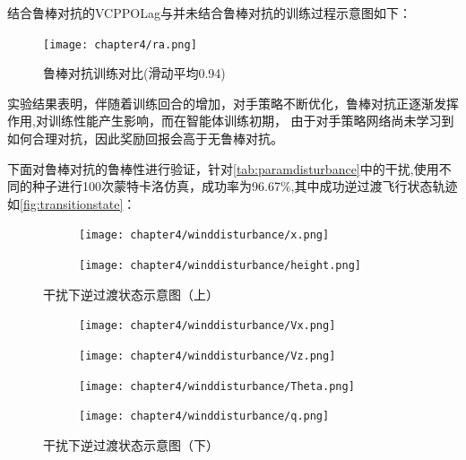 结合鲁棒对抗的VCPPOLag与并未结合鲁棒对抗的训练过程示意图如下：
\begin{figure}[htbp]
    \centering
    \texttt{[image: chapter4/ra.png]}
    \caption{\label{fig:ra}鲁棒对抗训练对比(滑动平均0.94)}
\end{figure}

实验结果表明，伴随着训练回合的增加，对手策略不断优化，鲁棒对抗正逐渐发挥作用,对训练性能产生影响，而在智能体训练初期，
由于对手策略网络尚未学习到如何合理对抗，因此奖励回报会高于无鲁棒对抗。

下面对鲁棒对抗的鲁棒性进行验证，针对\autoref{tab:paramdisturbance}中的干扰,使用不同的种子进行100次蒙特卡洛仿真，成功率为96.67$\%$,其中成功逆过渡飞行状态轨迹如\autoref{fig:transitionstate}：
\begin{figure}[H]
    \centering
    \begin{subfigure}{.55\textwidth}
        \centering
        \texttt{[image: chapter4/winddisturbance/x.png]}
        \label{fig:sub1-1}
    \end{subfigure}%
    \begin{subfigure}{.55\textwidth}
        \centering
        \texttt{[image: chapter4/winddisturbance/height.png]}
        \label{fig:sub2-1}
    \end{subfigure}
    \caption{干扰下逆过渡状态示意图（上）}
    \label{fig:transitionstate-up}
\end{figure}
\begin{figure}[H]
    \centering
    \begin{subfigure}{.55\textwidth}
        \centering
        \texttt{[image: chapter4/winddisturbance/Vx.png]}
        \label{fig:sub3-2}
    \end{subfigure}
    \begin{subfigure}{.55\textwidth}
        \centering
        \texttt{[image: chapter4/winddisturbance/Vz.png]}
        \label{fig:sub4-2}
    \end{subfigure}
    \begin{subfigure}{.55\textwidth}
        \centering
        \texttt{[image: chapter4/winddisturbance/Theta.png]}
        \label{fig:sub5-2}
    \end{subfigure}
    \begin{subfigure}{.55\textwidth}
        \centering
        \texttt{[image: chapter4/winddisturbance/q.png]}
        \label{fig:sub6-2}
    \end{subfigure}
    \caption{干扰下逆过渡状态示意图（下）}
    \label{fig:transitionstate-down}
\end{figure}


